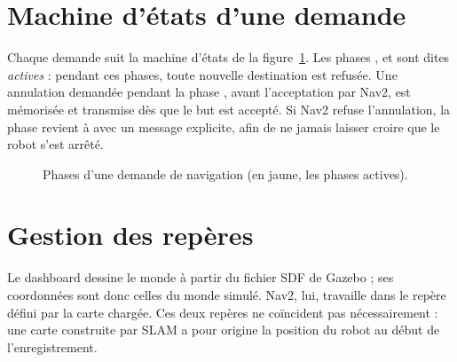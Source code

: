 \section{Machine d'états d'une demande}
Chaque demande suit la machine d'états de la figure~\ref{fig:etats}. Les phases
,  et  sont dites \emph{actives} : pendant
ces phases, toute nouvelle destination est refusée. Une annulation demandée pendant la
phase , avant l'acceptation par Nav2, est mémorisée et transmise dès que le
but est accepté. Si Nav2 refuse l'annulation, la phase revient à  avec un
message explicite, afin de ne jamais laisser croire que le robot s'est arrêté.

\begin{figure}[htbp]
\centering
{}
\caption{Phases d'une demande de navigation (en jaune, les phases actives).}
\label{fig:etats}
\end{figure}

\section{Gestion des repères}
Le dashboard dessine le monde à partir du fichier SDF de Gazebo ; ses coordonnées sont
donc celles du monde simulé. Nav2, lui, travaille dans le repère  défini par la
carte chargée. Ces deux repères ne coïncident pas nécessairement : une carte construite par
SLAM a pour origine la position du robot au début de l'enregistrement.

